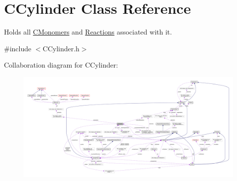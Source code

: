 \hypertarget{classCCylinder}{\section{C\+Cylinder Class Reference}
\label{classCCylinder}
}


Holds all \hyperlink{classCMonomer}{C\+Monomers} and \hyperlink{classReaction}{Reactions} associated with it.  




{\ttfamily \#include $<$C\+Cylinder.\+h$>$}



Collaboration diagram for C\+Cylinder\+:
\nopagebreak
\begin{figure}[H]
\begin{center}
\leavevmode
\includegraphics[width=350pt]{classCCylinder__coll__graph}
\end{center}
\end{figure}
